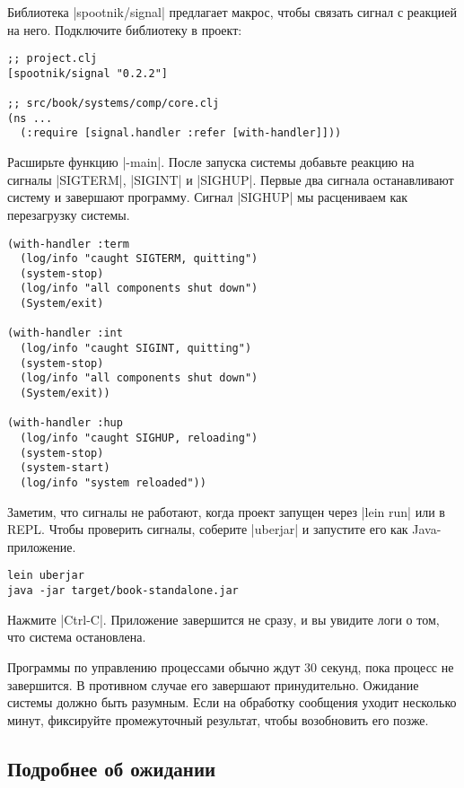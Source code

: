 Библиотека \spverb|spootnik/signal|
предлагает макрос, чтобы связать сигнал с реакцией на него. Подключите
библиотеку в проект:

\begin{verbatim}
;; project.clj
[spootnik/signal "0.2.2"]

;; src/book/systems/comp/core.clj
(ns ...
  (:require [signal.handler :refer [with-handler]]))
\end{verbatim}

Расширьте функцию \spverb|-main|. После запуска системы добавьте реакцию на
сигналы \spverb|SIGTERM|, \spverb|SIGINT| и \spverb|SIGHUP|. Первые два сигнала
останавливают систему и завершают программу. Сигнал \spverb|SIGHUP| мы
расцениваем как перезагрузку системы.

\begin{verbatim}
(with-handler :term
  (log/info "caught SIGTERM, quitting")
  (system-stop)
  (log/info "all components shut down")
  (System/exit)

(with-handler :int
  (log/info "caught SIGINT, quitting")
  (system-stop)
  (log/info "all components shut down")
  (System/exit))

(with-handler :hup
  (log/info "caught SIGHUP, reloading")
  (system-stop)
  (system-start)
  (log/info "system reloaded"))
\end{verbatim}

Заметим, что сигналы не работают, когда проект запущен через \spverb|lein run|
или в REPL. Чтобы проверить сигналы, соберите \spverb|uberjar| и запустите его
как Java-приложение.

\begin{verbatim}
lein uberjar
java -jar target/book-standalone.jar
\end{verbatim}

Нажмите \spverb|Ctrl-C|. Приложение завершится не сразу, и вы увидите логи о
том, что система остановлена.

Программы по управлению процессами обычно ждут 30 секунд, пока процесс не
завершится. В противном случае его завершают принудительно. Ожидание системы
должно быть разумным. Если на обработку сообщения уходит несколько минут,
фиксируйте промежуточный результат, чтобы возобновить его позже.

\subsection{Подробнее об ожидании}

